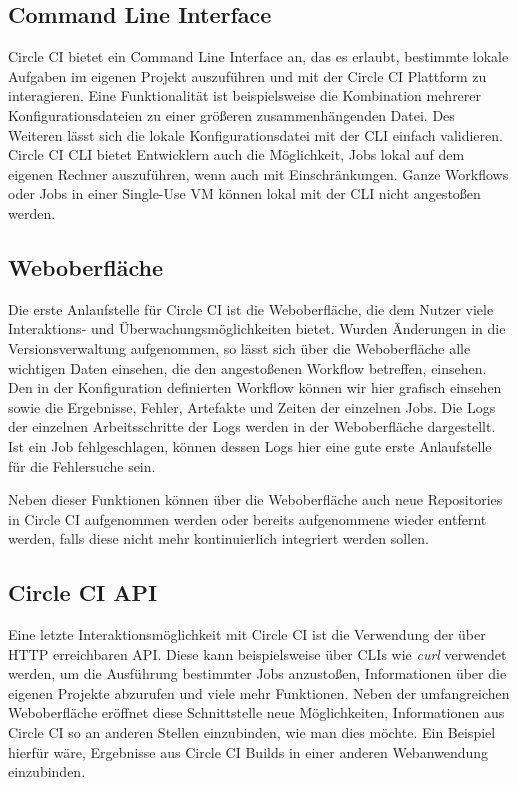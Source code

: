 \documentclass[11pt]{article}
\begin{document}
\subsection{Command Line Interface}
Circle CI bietet ein Command Line Interface an, das es erlaubt, bestimmte lokale Aufgaben im eigenen Projekt auszuführen und mit der Circle CI Plattform zu interagieren. Eine Funktionalität ist beispielsweise die Kombination mehrerer Konfigurationsdateien zu einer größeren zusammenhängenden Datei. Des Weiteren lässt sich die lokale Konfigurationsdatei mit der CLI einfach validieren. Circle CI CLI bietet Entwicklern auch die Möglichkeit, Jobs lokal auf dem eigenen Rechner auszuführen, wenn auch mit Einschränkungen. Ganze Workflows oder Jobs in einer Single-Use VM können lokal mit der CLI nicht angestoßen werden. 

\subsection{Weboberfläche}
Die erste Anlaufstelle für Circle CI ist die Weboberfläche, die dem Nutzer viele Interaktions- und Überwachungsmöglichkeiten bietet. Wurden Änderungen in die Versionsverwaltung aufgenommen, so lässt sich über die Weboberfläche alle wichtigen Daten einsehen, die den angestoßenen Workflow betreffen, einsehen. Den in der Konfiguration definierten Workflow können wir hier grafisch einsehen sowie die Ergebnisse, Fehler, Artefakte und Zeiten der einzelnen Jobs. Die Logs der einzelnen Arbeitsschritte der Logs werden in der Weboberfläche dargestellt. Ist ein Job fehlgeschlagen, können dessen Logs hier eine gute erste Anlaufstelle für die Fehlersuche sein.

Neben dieser Funktionen können über die Weboberfläche auch neue Repositories in Circle CI aufgenommen werden oder bereits aufgenommene wieder entfernt werden, falls diese nicht mehr kontinuierlich integriert werden sollen.

\subsection{Circle CI API}
Eine letzte Interaktionsmöglichkeit mit Circle CI ist die Verwendung der über HTTP erreichbaren API. Diese kann beispielsweise über CLIs wie \textit{curl} verwendet werden, um die Ausführung bestimmter Jobs anzustoßen, Informationen über die eigenen Projekte abzurufen und viele mehr Funktionen. Neben der umfangreichen Weboberfläche eröffnet diese Schnittstelle neue Möglichkeiten, Informationen aus Circle CI so an anderen Stellen einzubinden, wie man dies möchte. Ein Beispiel hierfür wäre, Ergebnisse aus Circle CI Builds in einer anderen Webanwendung einzubinden.
\end{document}
